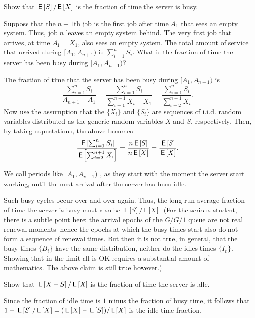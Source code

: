 \begin{exercise}[\faPhoto]\label{ex:29}
  Show that $\,\mathsf{E}\left[S\right]/\,\mathsf{E}\left[X\right]$ is the fraction of time the server is busy.
  \begin{hint}
Suppose that the $n+1$th job is the first job after time $A_1$ that sees an empty system.  Thus, job $n$ leaves an empty system behind. The very first job that arrives,  at time $A_1=X_1$, also sees an empty system. The total amount of service that arrived during $[A_1, A_{n+1})$ is $\sum_{i=1}^n S_i$.
    What is the fraction of time the server has been busy during $[A_1, A_{n+1})$? 
  \end{hint}
  \begin{solution}
 The
    fraction of time that the server has been busy during $[A_1, A_{n+1})$
    is
        \begin{equation*}
\frac{\sum_{i=1}^n S_i}{A_{n+1}-A_1} 
=          \frac{\sum_{i=1}^n S_i}{\sum_{i=1}^{n+1}X_i -X_1} 
=          \frac{\sum_{i=1}^n S_i}{\sum_{i=2}^{n+1}X_i}.
        \end{equation*}
        Now use the assumption that the $\{X_i\}$ and $\{S_i\}$ are
        sequences of i.i.d. random variables distributed as the
        generic random variables $X$ and $S$, respectively. Then, by
        taking expectations, the above becomes
        \begin{equation*}
\frac{\,\mathsf{E}\left[\sum_{i=1}^n S_i\right]}{\,\mathsf{E}\left[\sum_{i=2}^{n+1}X_i\right]} 
= \frac{n \,\mathsf{E}\left[S\right] }{n \,\mathsf{E}\left[X\right]} =
 \frac{ \,\mathsf{E}\left[S\right] }{ \,\mathsf{E}\left[X\right]}.
        \end{equation*}

We call periods like $[A_1, A_{n+1})$ , as they start with the moment the server start working, until the next arrival after the server has been idle. 

Such busy cycles occur over and over again.
Thus, the long-run average fraction of time the server is busy must also be $\,\mathsf{E}\left[S\right]/\,\mathsf{E}\left[X\right]$.
(For the serious student, there is a subtle point here: the arrival epochs of the $G/G/1$ queue are not real renewal moments, hence the epochs at which the busy times start also do not form a sequence of renewal times.
But then it is not true, in general, that the busy times $\{B_i\}$ have the same distribution, neither do the idles times $\{I_n\}$.
Showing that in the limit all is OK requires a substantial amount of mathematics.
The above claim is still true however.)
  \end{solution}
\end{exercise}

\begin{exercise}[\faFlask]
 Show that $\,\mathsf{E}\left[X - S\right]/\,\mathsf{E}\left[X\right]$ is the fraction of time
  the server is idle.
  \begin{solution}
    Since the fraction of idle time is $1$ minus the fraction of busy
    time, it follows that $1-\,\mathsf{E}\left[S\right]/ \,\mathsf{E}\left[X\right] = (\,\mathsf{E}\left[X\right] - \,\mathsf{E}\left[S\right])/\,\mathsf{E}\left[X\right]$ is the
    idle time fraction.
  \end{solution}
\end{exercise}



